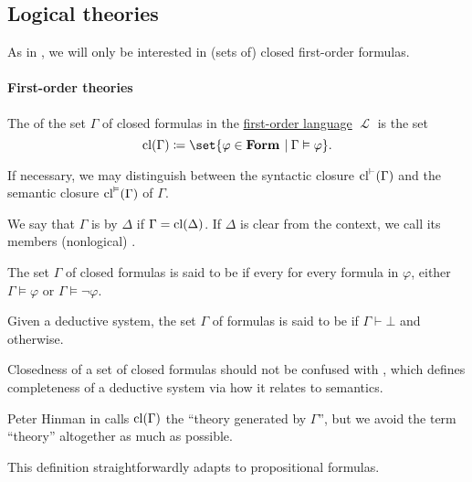 \subsection{Logical theories}\label{subsec:logical_theories}

As in , we will only be interested in (sets of) closed first-order formulas.

\paragraph{First-order theories}

\begin{definition}\label{def:first_order_theory}
  The  of the set \( \Gamma \) of closed formulas in the \hyperref[def:first_order_language]{first-order language} \( \mscrL \) is the set
  \begin{equation*}
    \cl(\Gamma) \coloneqq \set{ \varphi \in \boldop{Form} \given \Gamma \vDash \varphi }.
  \end{equation*}

  If necessary, we may distinguish between the syntactic closure \( \operatorname{cl}^\vdash(\Gamma) \) and the semantic closure \( \operatorname{cl}^\vDash(\Gamma) \) of \( \Gamma \).

  \begin{thmenum}
     We say that \( \Gamma \) is  by \( \Delta \) if \( \Gamma = \operatorname{cl}(\Delta) \). If \( \Delta \) is clear from the context, we call its members (nonlogical) .

    \medskip

     The set \( \Gamma \) of closed formulas is said to be  if every for every formula in \( \varphi \), either \( \Gamma \vDash \varphi \) or \( \Gamma \vDash \neg \varphi \).

     Given a deductive system, the set \( \Gamma \) of formulas is said to be  if \( \Gamma \vdash \bot \) and  otherwise.
  \end{thmenum}
\end{definition}
\begin{comments}
  \item Closedness of a set of closed formulas should not be confused with , which defines completeness of a deductive system via how it relates to semantics.

  \item Peter Hinman in  calls \( \operatorname{cl}(\Gamma) \) the \enquote{theory generated by \( \Gamma \)}, but we avoid the term \enquote{theory} altogether as much as possible.

  \item This definition straightforwardly adapts to propositional formulas.
\end{comments}

